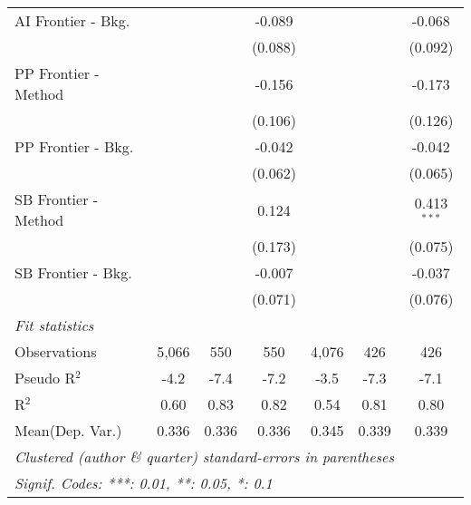 \begin{tabular}{lcccccc}
   AI Frontier - Bkg.          &         &              & -0.089         &         &             & -0.068\\   
                               &         &              & (0.088)        &         &             & (0.092)\\   
   PP Frontier - Method        &         &              & -0.156         &         &             & -0.173\\   
                               &         &              & (0.106)        &         &             & (0.126)\\   
   PP Frontier - Bkg.          &         &              & -0.042         &         &             & -0.042\\   
                               &         &              & (0.062)        &         &             & (0.065)\\   
   SB Frontier - Method        &         &              & 0.124          &         &             & 0.413$^{***}$\\   
                               &         &              & (0.173)        &         &             & (0.075)\\   
   SB Frontier - Bkg.          &         &              & -0.007         &         &             & -0.037\\   
                               &         &              & (0.071)        &         &             & (0.076)\\   
   \midrule
   \emph{Fit statistics}\\
   Observations                & 5,066   & 550          & 550            & 4,076   & 426         & 426\\  
   Pseudo R$^2$                & -4.2    & -7.4         & -7.2           & -3.5    & -7.3        & -7.1\\  
   R$^2$                       & 0.60    & 0.83         & 0.82           & 0.54    & 0.81        & 0.80\\  
Mean(Dep. Var.) & 0.336 & 0.336 & 0.336 & 0.345 & 0.339 & 0.339 \\
   \midrule \midrule
   \multicolumn{7}{l}{\emph{Clustered (author \& quarter) standard-errors in parentheses}}\\
   \multicolumn{7}{l}{\emph{Signif. Codes: ***: 0.01, **: 0.05, *: 0.1}}\\
\end{tabular}
\par\endgroup
